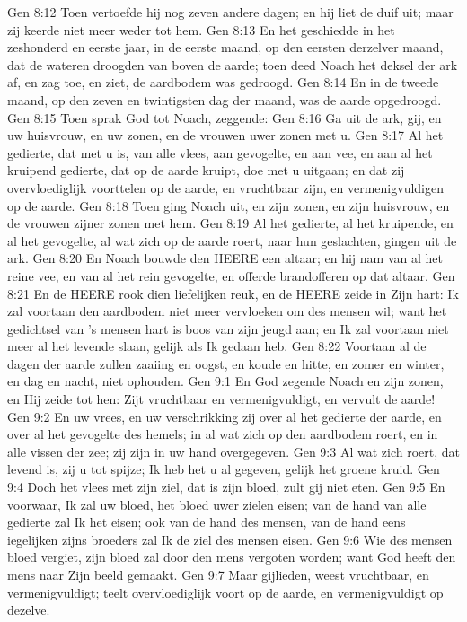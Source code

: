 Gen 8:12  Toen vertoefde hij nog zeven andere dagen; en hij liet de duif uit; maar zij keerde niet meer weder tot hem.
Gen 8:13  En het geschiedde in het zeshonderd en eerste jaar, in de eerste maand, op den eersten derzelver maand, dat de wateren droogden van boven de aarde; toen deed Noach het deksel der ark af, en zag toe, en ziet, de aardbodem was gedroogd.
Gen 8:14  En in de tweede maand, op den zeven en twintigsten dag der maand, was de aarde opgedroogd.
Gen 8:15  Toen sprak God tot Noach, zeggende:
Gen 8:16  Ga uit de ark, gij, en uw huisvrouw, en uw zonen, en de vrouwen uwer zonen met u.
Gen 8:17  Al het gedierte, dat met u is, van alle vlees, aan gevogelte, en aan vee, en aan al het kruipend gedierte, dat op de aarde kruipt, doe met u uitgaan; en dat zij overvloediglijk voorttelen op de aarde, en vruchtbaar zijn, en vermenigvuldigen op de aarde.
Gen 8:18  Toen ging Noach uit, en zijn zonen, en zijn huisvrouw, en de vrouwen zijner zonen met hem.
Gen 8:19  Al het gedierte, al het kruipende, en al het gevogelte, al wat zich op de aarde roert, naar hun geslachten, gingen uit de ark.
Gen 8:20  En Noach bouwde den HEERE een altaar; en hij nam van al het reine vee, en van al het rein gevogelte, en offerde brandofferen op dat altaar.
Gen 8:21  En de HEERE rook dien liefelijken reuk, en de HEERE zeide in Zijn hart: Ik zal voortaan den aardbodem niet meer vervloeken om des mensen wil; want het gedichtsel van 's mensen hart is boos van zijn jeugd aan; en Ik zal voortaan niet meer al het levende slaan, gelijk als Ik gedaan heb.
Gen 8:22  Voortaan al de dagen der aarde zullen zaaiing en oogst, en koude en hitte, en zomer en winter, en dag en nacht, niet ophouden.
Gen 9:1  En God zegende Noach en zijn zonen, en Hij zeide tot hen: Zijt vruchtbaar en vermenigvuldigt, en vervult de aarde!
Gen 9:2  En uw vrees, en uw verschrikking zij over al het gedierte der aarde, en over al het gevogelte des hemels; in al wat zich op den aardbodem roert, en in alle vissen der zee; zij zijn in uw hand overgegeven.
Gen 9:3  Al wat zich roert, dat levend is, zij u tot spijze; Ik heb het u al gegeven, gelijk het groene kruid.
Gen 9:4  Doch het vlees met zijn ziel, dat is zijn bloed, zult gij niet eten.
Gen 9:5  En voorwaar, Ik zal uw bloed, het bloed uwer zielen eisen; van de hand van alle gedierte zal Ik het eisen; ook van de hand des mensen, van de hand eens iegelijken zijns broeders zal Ik de ziel des mensen eisen.
Gen 9:6  Wie des mensen bloed vergiet, zijn bloed zal door den mens vergoten worden; want God heeft den mens naar Zijn beeld gemaakt.
Gen 9:7  Maar gijlieden, weest vruchtbaar, en vermenigvuldigt; teelt overvloediglijk voort op de aarde, en vermenigvuldigt op dezelve.
